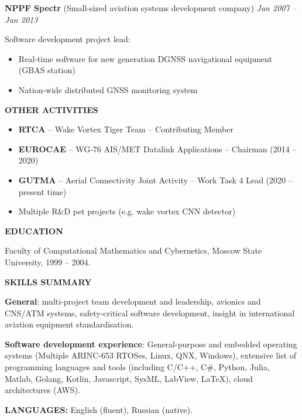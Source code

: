 \documentclass[a4paper]{article}
\begin{document}
    \textbf{NPPF Spectr} (Small-sized aviation systems development company) \hfill \textit{Jan 2007 -- Jun 2013}
    \vspace{1mm}
    
    Software development project lead:
	\begin{itemize}
		\setlength{\itemindent}{.5cm}
	    \item Real-time software for new generation DGNSS navigational equipment (GBAS station)
	    \item Nation-wide distributed GNSS monitoring system
    \end{itemize}
    \vspace{3mm}
    
    \textbf{OTHER ACTIVITIES}

	\begin{itemize}
	    \setlength{\itemindent}{.5cm}	
	    \item \textbf{RTCA} -- Wake Vortex Tiger Team -- Contributing Member
	    \item \textbf{EUROCAE} -- WG-76 AIS/MET Datalink Applications -- Chairman (2014 -- 2020)
	    \item \textbf{GUTMA} -- Aerial Connectivity Joint Activity -- Work Task 4 Lead (2020 -- present time)
	    \item Multiple R\&D pet projects (e.g. wake vortex CNN detector)
    \end{itemize}
    \vspace{3mm}
    
    \textbf{EDUCATION}
    \vspace{3mm}
    
    Faculty of Computational Mathematics and Cybernetics, Moscow State University, 1999 -- 2004.
    \vspace{5mm}
    
    \textbf{SKILLS SUMMARY}
    \vspace{3mm}
    
    \textbf{General}: multi-project team development and leadership, avionics and CNS/ATM systems, safety-critical software development, insight in international aviation equipment standardisation.
    \vspace{3mm}
    
    \textbf{Software development experience}: General-purpose and embedded operating systems (Multiple ARINC-653 RTOSes, Linux, QNX, Windows), extensive list of programming languages and tools (including C/C++, C\#, Python, Julia, Matlab, Golang, Kotlin, Javascript, SysML, LabView, LaTeX), cloud architectures (AWS).
    \vspace{5mm}
    
    \textbf{LANGUAGES:} English (fluent), Russian (native).
\end{document}
